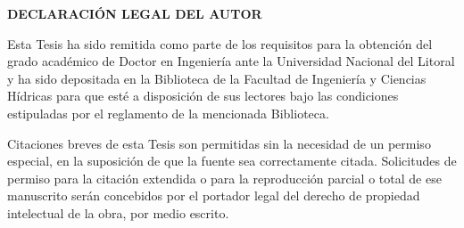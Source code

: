 \newpage
\thispagestyle{empty}
\vspace*{3em}
{\hfill\large \textbf{DECLARACIÓN LEGAL DEL AUTOR}\hfill\mbox{}}
\vspace{1em}

Esta Tesis ha sido remitida como parte de los requisitos para la obtención del
grado académico de Doctor en Ingeniería ante la Universidad Nacional del Litoral
y ha sido depositada en la Biblioteca de la Facultad de Ingeniería y Ciencias Hídricas
para que esté a disposición de sus lectores bajo las condiciones estipuladas
por el reglamento de la mencionada Biblioteca.

Citaciones breves de esta Tesis son permitidas sin la necesidad de un permiso
especial, en la suposición de que la fuente sea correctamente citada. Solicitudes
de permiso para la citación extendida o para la reproducción parcial o total de
ese manuscrito serán concebidos por el portador legal del derecho de propiedad
intelectual de la obra, por medio escrito.
